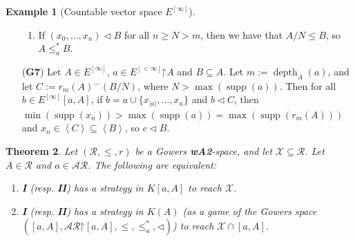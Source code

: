 \documentclass[11pt,reqno]{amsart}
\theoremstyle{plain}
\numberwithin{equation}{section}
\newtheorem{theorem}{Theorem}[section]
\theoremstyle{definition}
\newtheorem{example}[theorem]{Example}
\newcommand{\func}{\operatorname}
\renewcommand{\c}[1]{\left\langle #1 \right\rangle}
\newcommand{\cal}{\mathcal}
\newcommand{\supp}{\func{supp}}
\newcommand{\restrictedto}{\mathord{\upharpoonright}}
\newcommand{\X}{\cal{X}}
\newcommand{\depth}{\func{depth}}
\begin{document}
\begin{example}[Countable vector space $E^{[\infty]}$]
\begin{enumerate}
\begin{enumerate}[label=(\arabic*)]
            \item If $(x_0,\dots,x_n) \lhd B$ for all $n \geq N > m$, then we have that $A/N \leq B$, so $A \leq_a^* B$.
        \end{enumerate}

        \item[(\textbf{G7})] Let $A \in E^{[\infty]}$, $a \in E^{[<\infty]}\restrictedto A$ and $B \subseteq A$. Let $m := \depth_A(a)$, and let $C := r_m(A)^\frown(B/N)$, where $N > \max(\supp(a))$. Then for all $b \in E^{[\infty]}[a,A]$, if $b = a \cup \{x_{|a|},\dots,x_n\}$ and $b \lhd C$, then $\min(\supp(x_n)) > \max(\supp(a)) = \max(\supp(r_m(A)))$ and $x_n \in \c{C} \subseteq \c{B}$, so $c \lhd B$.
    \end{enumerate}
\end{example}

\begin{theorem}
\label{thm:kr.strategies.equivalence}
    Let $(\cal{R},\leq,r)$ be a Gowers \textbf{wA2}-space, and let $\X \subseteq \cal{R}$. Let $A \in \cal{R}$ and $a \in \cal{AR}$. The following are equivalent:
    \begin{enumerate}
        \item \textbf{I} (resp. \textbf{II}) has a strategy in $K[a,A]$ to reach $\X$.

        \item \textbf{I} (resp. \textbf{II}) has a strategy in $K(A)$ (as a game of the Gowers space $([a,A],\cal{AR}\restrictedto[a,A],\leq,\leq_a^*,\lhd)$) to reach $\X \cap [a,A]$.
    \end{enumerate}
\end{theorem}
\end{document}

